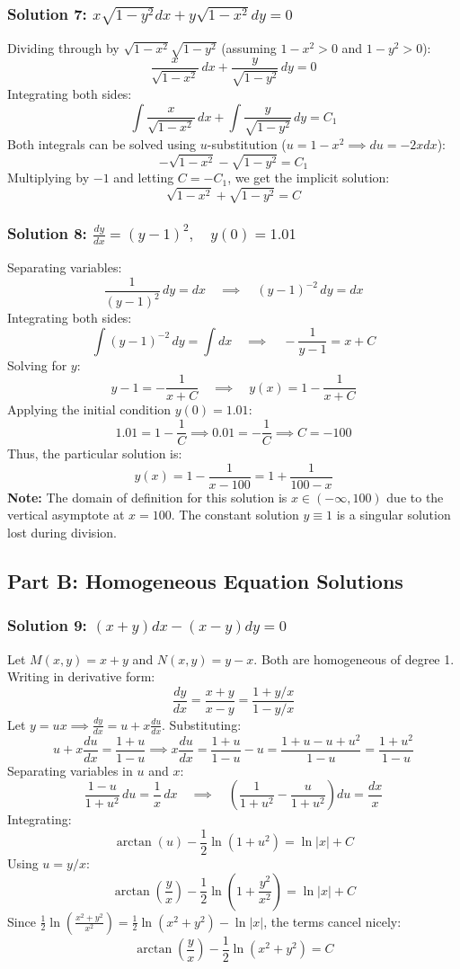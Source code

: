 \documentclass[11pt,letterpaper]{article}
\begin{document}
\subsubsection*{Solution 7: $x \sqrt{1-y^2} dx + y \sqrt{1-x^2} dy = 0$}
Dividing through by $\sqrt{1-x^2}\sqrt{1-y^2}$ (assuming $1-x^2 > 0$ and $1-y^2 > 0$):
\[ \frac{x}{\sqrt{1-x^2}} \, dx + \frac{y}{\sqrt{1-y^2}} \, dy = 0 \]
Integrating both sides:
\[ \int \frac{x}{\sqrt{1-x^2}} \, dx + \int \frac{y}{\sqrt{1-y^2}} \, dy = C_1 \]
Both integrals can be solved using $u$-substitution ($u = 1-x^2 \implies du = -2xdx$):
\[ -\sqrt{1-x^2} - \sqrt{1-y^2} = C_1 \]
Multiplying by $-1$ and letting $C = -C_1$, we get the implicit solution:
\[ \sqrt{1-x^2} + \sqrt{1-y^2} = C \]

\subsubsection*{Solution 8: $\frac{dy}{dx} = (y-1)^2, \quad y(0) = 1.01$}
Separating variables:
\[ \frac{1}{(y-1)^2} \, dy = dx \quad \implies \quad (y-1)^{-2} \, dy = dx \]
Integrating both sides:
\[ \int (y-1)^{-2} \, dy = \int dx \quad \implies \quad -\frac{1}{y-1} = x + C \]
Solving for $y$:
\[ y-1 = -\frac{1}{x+C} \quad \implies \quad y(x) = 1 - \frac{1}{x+C} \]
Applying the initial condition $y(0) = 1.01$:
\[ 1.01 = 1 - \frac{1}{C} \implies 0.01 = -\frac{1}{C} \implies C = -100 \]
Thus, the particular solution is:
\[ y(x) = 1 - \frac{1}{x-100} = 1 + \frac{1}{100-x} \]
\textbf{Note:} The domain of definition for this solution is $x \in (-\infty, 100)$ due to the vertical asymptote at $x = 100$. The constant solution $y \equiv 1$ is a singular solution lost during division.

\subsection*{Part B: Homogeneous Equation Solutions}

\subsubsection*{Solution 9: $(x+y)dx - (x-y)dy = 0$}
Let $M(x,y) = x+y$ and $N(x,y) = y-x$. Both are homogeneous of degree 1. Writing in derivative form:
\[ \frac{dy}{dx} = \frac{x+y}{x-y} = \frac{1+y/x}{1-y/x} \]
Let $y = ux \implies \frac{dy}{dx} = u + x\frac{du}{dx}$. Substituting:
\[ u + x\frac{du}{dx} = \frac{1+u}{1-u} \implies x\frac{du}{dx} = \frac{1+u}{1-u} - u = \frac{1+u - u + u^2}{1-u} = \frac{1+u^2}{1-u} \]
Separating variables in $u$ and $x$:
\[ \frac{1-u}{1+u^2} \, du = \frac{1}{x} \, dx \quad \implies \quad \left( \frac{1}{1+u^2} - \frac{u}{1+u^2} \right) du = \frac{dx}{x} \]
Integrating:
\[ \arctan(u) - \frac{1}{2}\ln(1+u^2) = \ln|x| + C \]
Using $u = y/x$:
\[ \arctan\left(\frac{y}{x}\right) - \frac{1}{2}\ln\left(1 + \frac{y^2}{x^2}\right) = \ln|x| + C \]
Since $\frac{1}{2}\ln\left(\frac{x^2+y^2}{x^2}\right) = \frac{1}{2}\ln(x^2+y^2) - \ln|x|$, the terms cancel nicely:
\[ \arctan\left(\frac{y}{x}\right) - \frac{1}{2}\ln(x^2+y^2) = C \]
\end{document}
